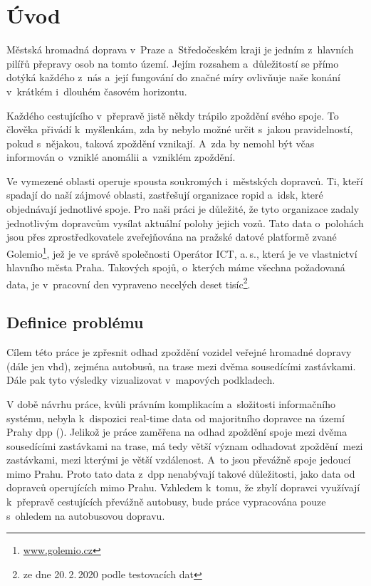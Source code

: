 \chapter*{Úvod}

Městská hromadná doprava v~Praze a~Středočeském kraji je jedním z~hlavních pilířů přepravy osob na tomto území. Jejím rozsahem a~důležitostí se přímo dotýká každého z~nás a~její fungování do značné míry ovlivňuje naše konání v~krátkém i~dlouhém časovém horizontu.

\bigbreak

Každého cestujícího v~přepravě jistě někdy trápilo zpoždění svého spoje. To člověka přivádí k~myšlenkám, zda by nebylo možné určit s~jakou pravidelností, pokud s~nějakou, taková zpoždění vznikají. A~zda by nemohl být včas informován o~vzniklé anomálii a~vzniklém zpoždění.

\bigbreak

Ve vymezené oblasti operuje spousta soukromých i~městských dopravců. Ti, kteří spadají do naší zájmové oblasti, zastřešují organizace \gls{ropid} a~\gls{idsk}, které objednávají jednotlivé spoje. Pro naši práci je důležité, že tyto organizace zadaly jednotlivým dopravcům vysílat aktuální polohy jejich vozů. Tato data o~polohách jsou přes zprostředkovatele zveřejňována na pražské datové platformě zvané Golemio\footnote{\url{www.golemio.cz}}, jež je ve správě společnosti Operátor ICT, a.\,s., která je ve vlastnictví hlavního města Praha. Takových spojů, o~kterých máme všechna požadovaná data, je v~pracovní den vypraveno necelých deset tisíc\footnote{ze dne 20.\,2.\,2020 podle testovacích dat}.

\section*{Definice problému}

Cílem této práce je zpřesnit odhad zpoždění vozidel veřejné hromadné dopravy (dále jen \gls{vhd}), zejména autobusů, na trase mezi dvěma sousedícími zastávkami. Dále pak tyto výsledky vizualizovat v~mapových podkladech.


\bigbreak

V době návrhu práce, kvůli právním komplikacím a~složitosti informačního systému, nebyla k~dispozici real-time data od majoritního dopravce na území Prahy \gls{dpp}  (\citet{Gurycova19}). Jelikož je práce zaměřena na odhad zpoždění spoje mezi dvěma sousedícími zastávkami na trase, má tedy větší význam odhadovat zpoždění mezi zastávkami, mezi kterými je větší vzdálenost. A~to jsou převážně spoje jedoucí mimo Prahu. Proto tato data z~\gls{dpp} nenabývají takové důležitosti, jako data od dopravců operujících mimo Prahu. Vzhledem k~tomu, že zbylí dopravci využívají k~přepravě cestujících převážně autobusy, bude práce vypracována pouze s~ohledem na autobusovou dopravu.

